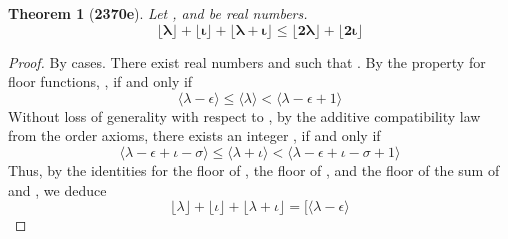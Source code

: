 \documentclass[preview]{standalone}
\newtheorem*{theorem*}{Theorem}
\begin{document}
\begin{theorem*}[\textbf{2370e}]
    Let \bm{$\lambda$}, and \bm{$\iota$} be real numbers.
    \begin{equation*}
        \bm{
            \big \lfloor \lambda \rfloor 
                + 
            \big \lfloor \iota \rfloor  
                + 
            \big \lfloor \lambda + \iota \rfloor 
                \le 
            \big \lfloor 2 \lambda \rfloor 
                + 
            \big \lfloor 2 \iota \rfloor
        }
    \end{equation*}
\end{theorem*}

\begin{proof}
    By cases.
    There exist real numbers \bm{$\epsilon$} and \bm{$\sigma$} such that
    \bm{$\lambda - \lfloor \lambda \rfloor = \epsilon$}. 
    By the property for floor functions,
    \bm{$\lfloor \lambda \rfloor = \lambda - \epsilon$},
    if and only if
    \begin{equation*}
        \Big \langle \lambda - \epsilon \Big \rangle
            \leq 
        \Big \langle \lambda \Big \rangle
            < 
        \Big \langle \lambda - \epsilon + 1 \Big \rangle
    \end{equation*}
    Without loss of generality with respect to \bm{$\iota$}, 
    by the additive compatibility law from the order axioms,
    there exists an integer 
    \bm{$
        \lfloor \lambda + \iota \rfloor 
            = 
        \big \langle \lambda - \epsilon \big \rangle
            +
        \big \langle \iota - \sigma \big \rangle$},
    if and only if
    \begin{equation*}
        \Big \langle
            \lambda - \epsilon
                + 
            \iota - \sigma
        \Big \rangle
            \leq 
        \Big \langle \lambda + \iota \Big \rangle
            < 
        \Big \langle
            \lambda - \epsilon
                + 
            \iota - \sigma
                + 
            1
        \Big \rangle
    \end{equation*}
    Thus, by the identities for the floor of \bm{$\lambda$},
    the floor of \bm{$\iota$}, 
    and the floor of the sum of \bm{$\lambda$} and \bm{$\iota$},
    we deduce 
    \begin{equation*}
        \big \lfloor \lambda \big \rfloor
            +
        \big \lfloor \iota \big \rfloor
            +
        \big \lfloor \lambda + \iota \big \rfloor
            =
        \Big[
            \big \langle \lambda - \epsilon \big \rangle

\end{equation*}
\end{proof}
\end{document}
